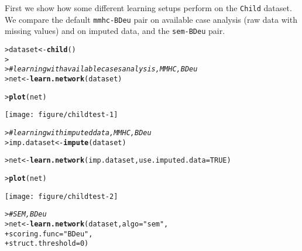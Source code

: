\documentclass{article}\usepackage[]{graphicx}\usepackage[]{color}
\makeatletter
\def\maxwidth{ %
  \ifdim\Gin@nat@width>\linewidth
    \linewidth
  \else
    \Gin@nat@width
  \fi
}
\newcommand{\hlnum}[1]{\textcolor[rgb]{0.686,0.059,0.569}{#1}}%
\newcommand{\hlstr}[1]{\textcolor[rgb]{0.192,0.494,0.8}{#1}}%
\newcommand{\hlcom}[1]{\textcolor[rgb]{0.678,0.584,0.686}{\textit{#1}}}%
\newcommand{\hlstd}[1]{\textcolor[rgb]{0.345,0.345,0.345}{#1}}%
\newcommand{\hlkwb}[1]{\textcolor[rgb]{0.69,0.353,0.396}{#1}}%
\newcommand{\hlkwc}[1]{\textcolor[rgb]{0.333,0.667,0.333}{#1}}%
\newcommand{\hlkwd}[1]{\textcolor[rgb]{0.737,0.353,0.396}{\textbf{#1}}}%
\newenvironment{kframe}{%
 \def\at@end@of@kframe{}%
 \ifinner\ifhmode%
  \def\at@end@of@kframe{\end{minipage}}%
  \begin{minipage}{\columnwidth}%
 \fi\fi%
 \def\FrameCommand##1{\hskip\@totalleftmargin \hskip-\fboxsep
 \colorbox{shadecolor}{##1}\hskip-\fboxsep
     \hskip-\linewidth \hskip-\@totalleftmargin \hskip\columnwidth}%
 \MakeFramed {\advance\hsize-\width
   \@totalleftmargin\z@ \linewidth\hsize
   \@setminipage}}%
 {\par\unskip\endMakeFramed%
 \at@end@of@kframe}
\newenvironment{knitrout}{}{} %
\makeatother
\begin{document}
First we show how some different learning setups perform on the \texttt{Child} dataset. We compare the default
\texttt{mmhc-BDeu} pair on available case analysis (raw data with missing values) and on imputed data, and
the \texttt{sem-BDeu} pair.

\begin{knitrout}
\color{fgcolor}\begin{kframe}
\begin{alltt}
\hlstd{> }\hlstd{dataset} \hlkwb{<-} \hlkwd{child}\hlstd{()}
\hlstd{> }
\hlstd{> }\hlcom{# learning with available cases analysis, MMHC, BDeu}
\hlstd{> }\hlstd{net} \hlkwb{<-} \hlkwd{learn.network}\hlstd{(dataset)}
\end{alltt}


{\ttfamily\noindent\itshape\color{messagecolor}{bnstruct :: learning the structure using MMHC ...\\bnstruct :: learning using MMHC completed.\\bnstruct :: learning network parameters ... \\bnstruct :: parameter learning done.}}\begin{alltt}
\hlstd{> }\hlkwd{plot}\hlstd{(net)}
\end{alltt}
\end{kframe}
\texttt{[image: figure/childtest-1]} 
\begin{kframe}\begin{alltt}
\hlstd{> }\hlcom{# learning with imputed data, MMHC, BDeu}
\hlstd{> }\hlstd{imp.dataset} \hlkwb{<-} \hlkwd{impute}\hlstd{(dataset)}
\end{alltt}


{\ttfamily\noindent\itshape\color{messagecolor}{bnstruct :: performing imputation ...\\bnstruct :: imputation finished.}}\begin{alltt}
\hlstd{> }\hlstd{net} \hlkwb{<-} \hlkwd{learn.network}\hlstd{(imp.dataset,} \hlkwc{use.imputed.data} \hlstd{=} \hlnum{TRUE}\hlstd{)}
\end{alltt}


{\ttfamily\noindent\itshape\color{messagecolor}{bnstruct :: learning the structure using MMHC ...\\bnstruct :: learning using MMHC completed.\\bnstruct :: learning network parameters ... \\bnstruct :: parameter learning done.}}\begin{alltt}
\hlstd{> }\hlkwd{plot}\hlstd{(net)}
\end{alltt}
\end{kframe}
\texttt{[image: figure/childtest-2]} 
\begin{kframe}\begin{alltt}
\hlstd{> }\hlcom{# SEM, BDeu}
\hlstd{> }\hlstd{net} \hlkwb{<-} \hlkwd{learn.network}\hlstd{(dataset,} \hlkwc{algo} \hlstd{=} \hlstr{"sem"}\hlstd{,}
\hlstd{+ }                     \hlkwc{scoring.func} \hlstd{=} \hlstr{"BDeu"}\hlstd{,}
\hlstd{+ }                     \hlkwc{struct.threshold} \hlstd{=} \hlnum{0}\hlstd{)}
\end{alltt}



\end{kframe}
\end{knitrout}
\end{document}
